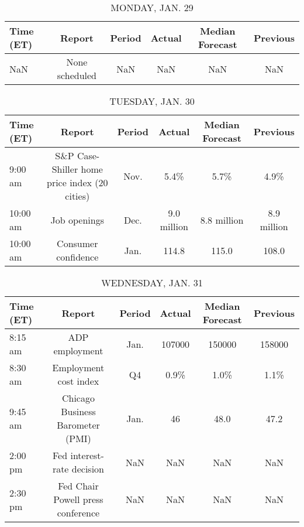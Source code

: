 \documentclass{article}%
\begin{document}
%
\normalsize%


\begin{table}[htbp]%
\caption{MONDAY, JAN. 29}%
\centering%
\begin{adjustbox}{width=1\textwidth}%
\begin{tabular}{lccccc}
\toprule
Time (ET) &         Report & Period & Actual & Median Forecast & Previous \\
\midrule
      NaN & None scheduled &    NaN &    NaN &             NaN &      NaN \\
\bottomrule
\end{tabular}
%
\end{adjustbox}%
\end{table}

%


\begin{table}[htbp]%
\caption{TUESDAY, JAN. 30}%
\centering%
\begin{adjustbox}{width=1\textwidth}%
\begin{tabular}{lccccc}
\toprule
Time (ET) &                                        Report & Period &      Actual & Median Forecast &    Previous \\
\midrule
  9:00 am & S\&P Case-Shiller home price index (20 cities) &   Nov. &        5.4\% &            5.7\% &        4.9\% \\
 10:00 am &                                  Job openings &   Dec. & 9.0 million &     8.8 million & 8.9 million \\
 10:00 am &                           Consumer confidence &   Jan. &       114.8 &           115.0 &       108.0 \\
\bottomrule
\end{tabular}
%
\end{adjustbox}%
\end{table}

%


\begin{table}[htbp]%
\caption{WEDNESDAY, JAN. 31}%
\centering%
\begin{adjustbox}{width=1\textwidth}%
\begin{tabular}{lccccc}
\toprule
Time (ET) &                            Report & Period & Actual & Median Forecast & Previous \\
\midrule
  8:15 am &                    ADP employment &   Jan. & 107000 &          150000 &   158000 \\
  8:30 am &             Employment cost index &     Q4 &   0.9\% &            1.0\% &     1.1\% \\
  9:45 am &  Chicago Business Barometer (PMI) &   Jan. &     46 &            48.0 &     47.2 \\
  2:00 pm &        Fed interest-rate decision &    NaN &    NaN &             NaN &      NaN \\
  2:30 pm & Fed Chair Powell press conference &    NaN &    NaN &             NaN &      NaN \\
\bottomrule
\end{tabular}
%
\end{adjustbox}%
\end{table}
\end{document}
